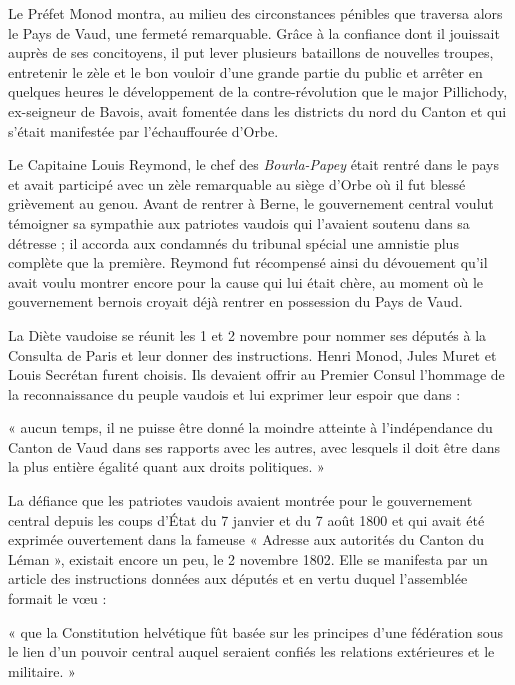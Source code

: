 \documentclass[french,twoside]{book} %
\newenvironment{quoteblock}%
  {\begin{quoting}}
  {\end{quoting}}
\newenvironment{quotebar}{%
    \def\FrameCommand{{\color{rubric!10!}\vrule width 0.5em} \hspace{0.9em}}%
    \def\OuterFrameSep{\itemsep} %
    \MakeFramed {\advance\hsize-\width \FrameRestore}
  }%
  {%
    \endMakeFramed
  }
\renewenvironment{quoteblock}%
  {%
    \savenotes
    \setstretch{0.9}
    \begin{quotebar}
  }
  {%
    \end{quotebar}
    \spewnotes
  }
\begin{document}
Le Préfet Monod montra, au milieu des circonstances pénibles que traversa alors le Pays de Vaud, une fermeté remarquable. Grâce à la confiance dont il jouissait auprès de ses concitoyens, il put lever plusieurs bataillons de nouvelles troupes, entretenir le zèle et le bon vouloir d’une grande partie du public et arrêter en quelques heures le développement de la contre-révolution que le major Pillichody, ex-seigneur de Bavois, avait fomentée dans les districts du nord du Canton et qui s’était manifestée par l’échauffourée d’Orbe.\par
Le Capitaine Louis Reymond, le chef des \emph{Bourla-Papey} était rentré dans le pays et avait participé avec un zèle remarquable au siège d’Orbe où il fut blessé grièvement au genou. Avant de rentrer à Berne, le gouvernement central voulut témoigner sa sympathie aux patriotes vaudois qui l’avaient soutenu dans sa détresse ; il accorda aux condamnés du tribunal spécial une amnistie plus complète que la première. Reymond fut récompensé ainsi du dévouement qu’il avait voulu montrer encore pour la cause qui lui était chère, au moment où le gouvernement bernois croyait déjà rentrer en possession du Pays de Vaud.\par
La Diète vaudoise se réunit les 1 et 2 novembre pour nommer ses députés à la Consulta de Paris et leur donner des instructions. Henri Monod, Jules Muret et Louis Secrétan furent choisis. Ils devaient offrir au Premier Consul l’hommage de la reconnaissance du peuple vaudois et lui exprimer leur espoir que dans :\par

\begin{quoteblock}
\noindent « aucun temps, il ne puisse être donné la moindre atteinte à l’indépendance du Canton de Vaud dans ses rapports avec les autres, avec lesquels il doit être dans la plus entière égalité quant aux droits politiques. »\end{quoteblock}

\noindent La défiance que les patriotes vaudois avaient montrée pour le gouvernement central depuis les coups d’État du 7 janvier et du 7 août 1800 et qui avait été exprimée ouvertement dans la fameuse « Adresse aux autorités du Canton du Léman », existait encore un peu, le 2 novembre 1802. Elle se manifesta par un article des instructions données aux députés et en vertu duquel l’assemblée formait le vœu :\par

\begin{quoteblock}
\noindent « que la Constitution helvétique fût basée sur les principes d’une fédération sous le lien d’un pouvoir central auquel seraient confiés les relations extérieures et le militaire. »\end{quoteblock}
\end{document}
